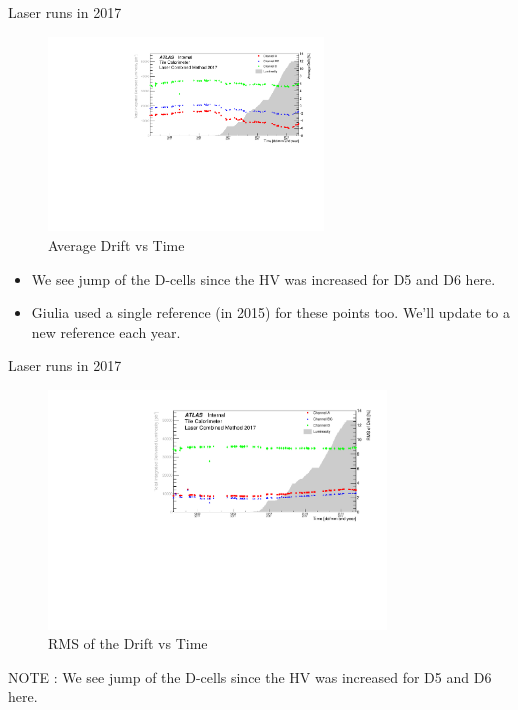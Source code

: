 \documentclass{beamer}
\begin{document}
\begin{frame}{Laser runs in 2017}{}
\begin{figure}
\centering
\includegraphics[width=0.65\textwidth]{drm17.pdf}
\caption{Average Drift vs Time}
\end{figure}
\begin{itemize}
    \item We see jump of the D-cells since the HV was increased for D5 and D6 here.
    \item Giulia used a single reference (in 2015) for these points too. We'll update to a new reference each year.
\end{itemize}
\end{frame}

\begin{frame}{Laser runs in 2017}{}
\begin{figure}
\centering
\includegraphics[width=0.8\textwidth]{drr17.pdf}
\caption{RMS of the Drift vs Time}
\end{figure}
NOTE : We see jump of the D-cells since the HV was increased for D5 and D6 here.

\end{frame}
\end{document}

